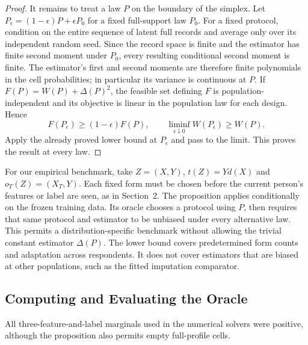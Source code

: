 \begin{proof}
It remains to treat a law $P$ on the boundary of the simplex. Let $P_\epsilon=(1-\epsilon)P+\epsilon P_0$ for a fixed full-support law $P_0$. For a fixed protocol, condition on the entire sequence of latent full records and average only over its independent random seed. Since the record space is finite and the estimator has finite second moment under $P_0$, every resulting conditional second moment is finite. The estimator's first and second moments are therefore finite polynomials in the cell probabilities; in particular its variance is continuous at $P$. If $F(P)=W(P)+\Delta(P)^2$, the feasible set defining $F$ is population-independent and its objective is linear in the population law for each design. Hence
\[
 F(P_\epsilon)\ge(1-\epsilon)F(P),\qquad
 \liminf_{\epsilon\downarrow0}W(P_\epsilon)\ge W(P).
\]
Apply the already proved lower bound at $P_\epsilon$ and pass to the limit. This proves the result at every law.
\end{proof}

For our empirical benchmark, take $Z=(X,Y)$, $t(Z)=Yd(X)$ and $o_T(Z)=(X_T,Y)$. Each fixed form must be chosen before the current person's features or label are seen, as in Section~2. The proposition applies conditionally on the frozen training data. Its oracle chooses a protocol using $P$, then requires that same protocol and estimator to be unbiased under every alternative law. This permits a distribution-specific benchmark without allowing the trivial constant estimator $\Delta(P)$. The lower bound covers predetermined form counts and adaptation across respondents. It does not cover estimators that are biased at other populations, such as the fitted imputation comparator.

\subsection{Computing and Evaluating the Oracle}
All three-feature-and-label marginals used in the numerical solvers were positive, although the proposition also permits empty full-profile cells.
